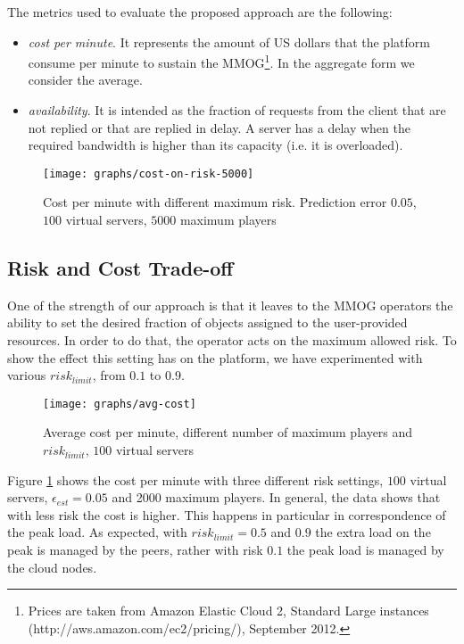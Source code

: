 \documentclass[final,10pt,a5paper]{phdimt}
\theoremstyle{definition}
\begin{document}
The metrics used to evaluate the proposed approach are the following:
\begin{itemize}
\item \textit{cost per minute}. It represents the amount of US dollars that the platform consume per minute to sustain the MMOG\footnote{Prices are taken from Amazon Elastic Cloud 2, Standard Large instances (http://aws.amazon.com/ec2/pricing/), September 2012.}. In the aggregate form we consider the average.
\item \textit{availability}. It is intended as the fraction of requests from the client that are not replied or that are replied in delay. A server has a delay when the required bandwidth is higher than its capacity (i.e. it is overloaded).
\end{itemize}


\begin{figure}[tbh]
\centering
\texttt{[image: graphs/cost-on-risk-5000]}
\caption{Cost per minute with different maximum risk. Prediction error $0.05$, $100$ virtual servers, $5000$ maximum players}
\label{fig:cost-on-risk}
\end{figure}

\subsection{Risk and Cost Trade-off}

One of the strength of our approach is that it leaves to the MMOG operators the ability to set the desired fraction of objects assigned to the user-provided resources. In order to do that, the operator acts on the maximum allowed risk. To show the effect this setting has on the platform, we have experimented with various $risk_{limit}$, from $0.1$ to $0.9$.

\begin{figure}[tbh]
\centering
\texttt{[image: graphs/avg-cost]}
\caption{Average cost per minute, different number of maximum players and $risk_{limit}$, $100$ virtual servers}
\label{fig:avg-cost}
\end{figure}


Figure \ref{fig:cost-on-risk} shows the cost per minute with three different risk settings, $100$ virtual servers, $\epsilon_{est}=0.05$ and 2000 maximum players.
In general, the data shows that with less risk the cost is higher.
This happens in particular in correspondence of the peak load.
As expected, with $risk_{limit} = 0.5$ and $0.9$ the extra load on the peak is managed by the peers, rather with risk $0.1$ the peak load is managed by the cloud nodes.
 
\end{document}
